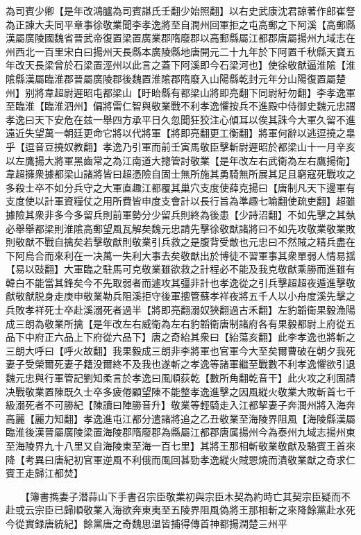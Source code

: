 為司賓少卿【是年改鴻臚為司賓諶氏壬翻少始照翻】以右史武康沈君諒著作郎崔詧為正諫大夫同平章事徐敬業聞李孝逸將至自潤州回軍拒之屯高郵之下阿溪【高郵縣漢屬廣陵國魏省晉武帝復置梁置廣業郡隋廢郡以高郵縣屬江都郡唐屬揚州九域志在州西北一百里宋白曰揚州天長縣本廣陵縣地唐開元二十九年於下阿置千秋縣天寶五年改天長梁曾於石梁置涇州以此言之蓋下阿溪即今石梁河也】使徐敬猷逼淮隂【淮隂縣漢屬臨淮郡晉屬廣陵郡後魏置淮隂郡隋廢入山陽縣乾封元年分山陽復置屬楚州】别將韋超尉遲昭屯都梁山【盱眙縣有都梁山將即亮翻下同尉紆勿翻】李孝逸軍至臨淮【臨淮泗州】偏將雷仁智與敬業戰不利孝逸懼按兵不進殿中侍御史魏元忠謂孝逸曰天下安危在兹一舉四方承平日久忽聞狂狡注心傾耳以俟其誅今大軍久留不進遠近失望萬一朝廷更命它將以代將軍【將即亮翻更工衡翻】將軍何辭以逃逗撓之辠乎【逗音豆撓奴教翻】孝逸乃引軍而前壬寅馬敬臣擊斬尉遲昭於都梁山十一月辛亥以左鷹揚大將軍黑齒常之為江南道大摠管討敬業【是年改左右武衛為左右鷹揚衛】韋超擁衆據都梁山諸將皆曰超憑險自固士無所施其勇騎無所展其足且窮寇死戰攻之多殺士卒不如分兵守之大軍直趣江都覆其巢穴支度使薛克揚曰【唐制凡天下邊軍有支度使以計軍資糧仗之用所費皆申度支會計以長行旨為準趣七喻翻使疏吏翻】超雖據險其衆非多今多留兵則前軍勢分少留兵則終為後患【少詩沼翻】不如先擊之其埶必舉舉都梁則淮隂高郵望風瓦解矣魏元忠請先擊徐敬猷諸將曰不如先攻敬業敬業敗則敬猷不戰自擒矣若擊敬猷則敬業引兵救之是腹背受敵也元忠曰不然賊之精兵盡在下阿烏合而來利在一决萬一失利大事去矣敬猷出於博徒不習軍事其衆單弱人情易揺【易以豉翻】大軍臨之駐馬可克敬業雖欲救之計程必不能及我克敬猷乘勝而進雖有韓白不能當其鋒矣今不先取弱者而遽攻其彊非計也孝逸從之引兵擊超超夜遁進擊敬猷敬猷脱身走庚申敬業勒兵阻溪拒守後軍摠管蘇孝祥夜將五千人以小舟度溪先擊之兵敗孝祥死士卒赴溪溺死者過半【將即亮翻溺奴狹翻過古禾翻】左豹韜衛果毅漁陽成三朗為敬業所擒【是年改左右威衛為左右豹韜衛唐制諸府各有果毅都尉上府從五品下中府正六品上下府從六品下】唐之奇紿其衆曰【紿蕩亥翻】此李孝逸也將斬之三朗大呼曰【呼火故翻】我果毅成三朗非李將軍也官軍今大至矣爾曹破在朝夕我死妻子受榮爾死妻子籍没爾終不及我也遂斬之孝逸等諸軍繼至戰數不利孝逸懼欲引退魏元忠與行軍管記劉知柔言於孝逸曰風順荻乾【數所角翻乾音干】此火攻之利固請决戰敬業置陳既久士卒多疲倦顧望陳不能整孝逸進擊之因風縱火敬業大敗斬首七千級溺死者不可勝紀【陳讀曰陣勝音升】敬業等輕騎走入江都挈妻子奔潤州將入海奔高麗【麗力知翻】孝逸進屯江都分遣諸將追之乙丑敬業至海陵界阻風【海陵縣漢屬臨淮後漢晉屬廣陵梁置海陵郡隋廢郡為縣屬江都郡唐属揚州今為泰州九域志揚州東至海陵界九十八里又自海陵東至海一百七里】其將王那相斬敬業敬猷及駱賓王首來降【考異曰唐紀初官軍逆風不利俄而風回甚勁孝逸縱火賊愳燒而潰敬業猷之奇求仁賓王走歸江都焚】

　　【簿書擕妻子潜蒜山下手書召宗臣敬業初與宗臣木契為約時亡其契宗臣疑而不赴或云宗臣已歸順敬業入海欲奔東夷至五陵界阻風偽將王那相斬之來降餘黨赴水死今從實録唐統紀】餘黨唐之奇魏思温皆捕得傳首神都揚潤楚三州平

